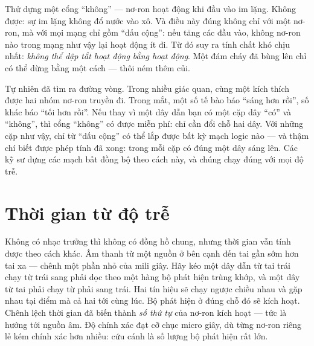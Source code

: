 Thử dựng một cổng ``không'' --- nơ-ron hoạt động khi đầu vào im lặng. Không được: sự im lặng không đổ nước vào xô. Và điều này đúng không chỉ với một nơ-ron, mà với mọi mạng chỉ gồm ``dấu cộng'': nếu tăng các đầu vào, không nơ-ron nào trong mạng như vậy lại hoạt động ít đi. Từ đó suy ra tính chất khó chịu nhất: \emph{không thể dập tắt hoạt động bằng hoạt động}. Một đám cháy đã bùng lên chỉ có thể dừng bằng một cách --- thôi ném thêm củi.

Tự nhiên đã tìm ra đường vòng. Trong nhiều giác quan, cùng một kích thích được hai nhóm nơ-ron truyền đi. Trong mắt, một số tế bào báo ``sáng hơn rồi'', số khác báo ``tối hơn rồi''. Nếu thay vì một dây dẫn bạn có một cặp dây ``có'' và ``không'', thì cổng ``không'' có được miễn phí: chỉ cần đổi chỗ hai dây. Với những cặp như vậy, chỉ từ ``dấu cộng'' có thể lắp được bất kỳ mạch logic nào --- và thậm chí biết được phép tính đã xong: trong mỗi cặp có đúng một dây sáng lên. Các kỹ sư dựng các mạch bất đồng bộ theo cách này, và chúng chạy đúng với mọi độ trễ.

\section*{Thời gian từ độ trễ}

Không có nhạc trưởng thì không có đồng hồ chung, nhưng thời gian vẫn tính được theo cách khác. Âm thanh từ một nguồn ở bên cạnh đến tai gần sớm hơn tai xa --- chênh một phần nhỏ của mili giây. Hãy kéo một dây dẫn từ tai trái chạy từ trái sang phải dọc theo một hàng bộ phát hiện trùng khớp, và một dây từ tai phải chạy từ phải sang trái. Hai tín hiệu sẽ chạy ngược chiều nhau và gặp nhau tại điểm mà cả hai tới cùng lúc. Bộ phát hiện ở đúng chỗ đó sẽ kích hoạt. Chênh lệch thời gian đã biến thành \emph{số thứ tự} của nơ-ron kích hoạt --- tức là hướng tới nguồn âm. Độ chính xác đạt cỡ chục micro giây, dù từng nơ-ron riêng lẻ kém chính xác hơn nhiều: cứu cánh là số lượng bộ phát hiện rất lớn.


